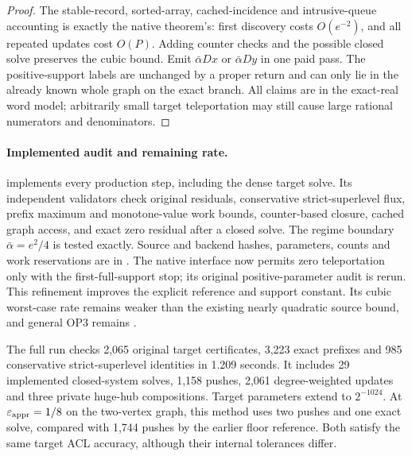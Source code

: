 \begin{proof}
The stable-record, sorted-array, cached-incidence and intrusive-queue
accounting is exactly the native theorem's: first discovery costs
$O(e^{-2})$, and all repeated updates cost $O(P)$. Adding counter
checks and the possible closed solve preserves the cubic bound.
Emit $\bar\alpha D x$ or $\bar\alpha D y$ in one paid pass.
The positive-support labels are unchanged by a proper return and can
only lie in the already known whole graph on the exact branch.
All claims are in the exact-real word model; arbitrarily small target
teleportation may still cause large rational numerators and denominators.
\end{proof}

\paragraph{Implemented audit and remaining rate.}
 implements every production step,
including the dense target solve. Its independent validators check
original residuals, conservative strict-superlevel flux, prefix maximum
and monotone-value work bounds, counter-based closure, cached graph access,
and exact zero residual after a closed solve. The regime boundary
$\bar\alpha=e^2/4$ is tested exactly. Source and backend hashes,
parameters, counts and work reservations are in
.
The native interface now permits zero teleportation only with the
first-full-support stop; its original positive-parameter audit is rerun.
This refinement improves the explicit reference and support constant.
Its cubic worst-case rate remains weaker than the existing nearly
quadratic source bound, and general OP3 remains \statusopen.

The full run checks 2,065 original target certificates, 3,223 exact
prefixes and 985 conservative strict-superlevel identities in 1.209
seconds. It includes 29 implemented closed-system solves, 1,158 pushes,
2,061 degree-weighted updates and three private huge-hub compositions.
Target parameters extend to $2^{-1024}$. At $\varepsilon_{\mathrm{appr}}=1/8$ on the
two-vertex graph, this method uses two pushes and one exact solve,
compared with 1,744 pushes by the earlier floor reference. Both satisfy
the same target ACL accuracy, although their internal tolerances differ.
